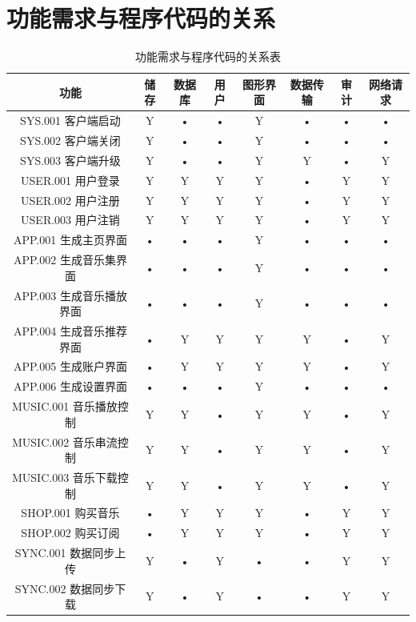 \section{功能需求与程序代码的关系}
\begin{table}[htbp]
\centering
\caption{功能需求与程序代码的关系表} \label{tab:requirement-module}


\begin{tabular}{|c|c|c|c|c|c|c|c|}
    \hline
    功能 &              储存 & 数据库 & 用户 & 图形界面 & 数据传输 & 审计 & 网络请求 \\
    \hline
    SYS.001 客户端启动 &   Y &    •   & •    &     Y    &    •     &  •   &   •      \\
    \hline
    SYS.002 客户端关闭 &   Y &    •   & •    &     Y    &    •     &  •   &   •      \\
    \hline
    SYS.003 客户端升级 &   Y &    •   & •    &     Y    &    Y     &  •   &   Y      \\
    \hline
    USER.001 用户登录  &   Y &    Y   & Y    &     Y    &    •     &  Y   &   Y      \\
    \hline
    USER.002 用户注册  &   Y &    Y   & Y    &     Y    &    •     &  Y   &   Y      \\
    \hline
    USER.003 用户注销  &   Y &    Y   & Y    &     Y    &    •     &  Y   &   Y      \\
    \hline
APP.001 生成主页界面   &   • &    •   & •    &     Y    &    •     &  •   &   •      \\
    \hline
APP.002 生成音乐集界面 &   • &    •   & •    &     Y    &    •     &  •   &   •      \\
    \hline
APP.003 生成音乐播放界面 & • &    •   & •    &     Y    &    •     &  •   &   •      \\
    \hline
APP.004 生成音乐推荐界面 & • &    Y   & Y    &     Y    &    Y     &  •   &   Y      \\
    \hline
APP.005 生成账户界面   &   • &    Y   & Y    &     Y    &    Y     &  •   &   Y      \\
    \hline
APP.006 生成设置界面   &   • &    •   & •    &     Y    &    •     &  •   &   •      \\
    \hline
MUSIC.001 音乐播放控制 &   Y &    Y   & •    &     Y    &    Y     &  •   &   Y      \\
    \hline
MUSIC.002 音乐串流控制 &   Y &    Y   & •    &     Y    &    Y     &  •   &   Y      \\
    \hline
MUSIC.003 音乐下载控制 &   Y &    Y   & •    &     Y    &    Y     &  •   &   Y      \\
    \hline
    SHOP.001 购买音乐  &   • &    Y   & Y    &     Y    &    •     &  Y   &   Y      \\
    \hline
    SHOP.002 购买订阅  &   • &    Y   & Y    &     Y    &    •     &  Y   &   Y      \\
    \hline
SYNC.001 数据同步上传  &   Y &    •   & Y    &     •    &    •     &  Y   &   Y      \\
    \hline
SYNC.002 数据同步下载  &   Y &    •   & Y    &     •    &    •     &  Y   &   Y      \\
    \hline

\end{tabular}
\end{table}